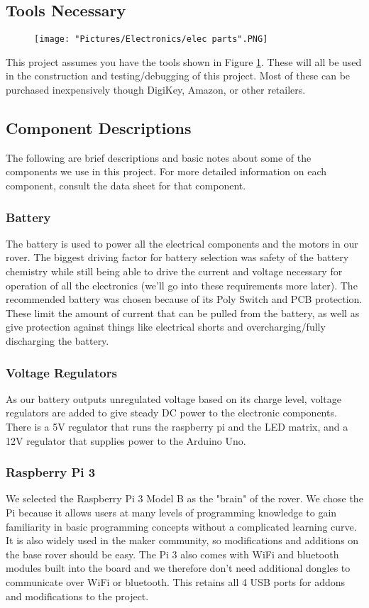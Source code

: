 \documentclass{article}
\begin{document}
\subsection{Tools Necessary}

\begin{figure}[H]
  	\centering
   	\texttt{[image: "Pictures/Electronics/elec parts".PNG]}
  	\caption{}
	\label{elec parts}
\end{figure}

This project assumes you have the tools shown in Figure \ref{elec parts}. These will all be used in the construction and testing/debugging of this project. Most of these can be purchased inexpensively though DigiKey, Amazon, or other retailers. 

\subsection{Component Descriptions}
The following are brief descriptions and basic notes about some of the components we use in this project. For more detailed information on each component, consult the data sheet for that component. 
\subsubsection{Battery}
The battery is used to power all the electrical components and the motors in our rover. The biggest driving factor for battery selection was safety of the battery chemistry while still being able to drive the current and voltage necessary for operation of all the electronics (we'll go into these requirements more later). The recommended battery was chosen because of its Poly Switch and PCB protection. These limit the amount of current that can be pulled from the battery, as well as give protection against things like electrical shorts and overcharging/fully discharging the battery. 
\subsubsection{Voltage Regulators}
As our battery outputs unregulated voltage based on its charge level, voltage regulators are added to give steady DC power to the electronic components. There is a 5V regulator that runs the raspberry pi and the LED matrix, and a 12V regulator that supplies power to the Arduino Uno.
\subsubsection{Raspberry Pi 3}
We selected the Raspberry Pi 3 Model B as the "brain" of the rover. We chose the Pi because it allows users at many levels of programming knowledge to gain familiarity in basic programming concepts without a complicated learning curve. It is also widely used in the maker community, so modifications and additions on the base rover should be easy. The Pi 3 also comes with WiFi and bluetooth modules built into the board and we therefore don't need additional dongles to communicate over WiFi or bluetooth.  This retains all 4 USB ports for addons and modifications to the project.  
\end{document}
